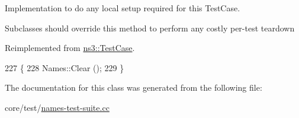 Implementation to do any local setup required for this Test\+Case. 

Subclasses should override this method to perform any costly per-\/test teardown 

Reimplemented from \hyperlink{classns3_1_1TestCase_a8917f1604e28d312a8086f76291e3c46}{ns3\+::\+Test\+Case}.


\begin{DoxyCode}
227 \{
228   Names::Clear ();
229 \}
\end{DoxyCode}


The documentation for this class was generated from the following file\+:\begin{DoxyCompactItemize}
\item 
core/test/\hyperlink{names-test-suite_8cc}{names-\/test-\/suite.\+cc}\end{DoxyCompactItemize}
